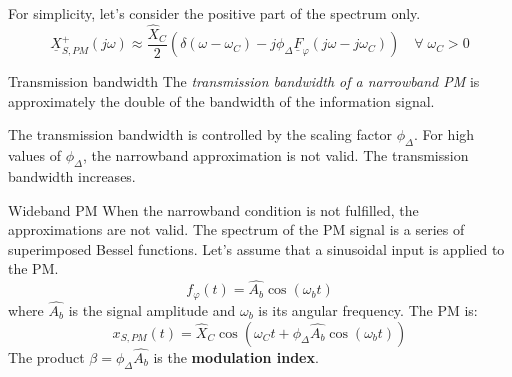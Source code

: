 \begin{refsection}
For simplicity, let's consider the positive part of the spectrum only.
\begin{equation}
	\underline{X}_{S,PM}^{+}\left(j\omega\right) \approx \frac{\hat{X}_C}{2} \left( \delta\left(\omega-\omega_C\right) - j \phi_{\Delta} \underline{F}_{\varphi}\left(j\omega-j\omega_C\right) \right) \quad \forall \; \omega_C > 0
\end{equation}

\begin{definition}{Transmission bandwidth}
	The  \emph{transmission bandwidth of a narrowband \ac{PM}} is approximately the double of the bandwidth of the information signal.
\end{definition}

%
%

The transmission bandwidth is controlled by the scaling factor $\phi_{\Delta}$. For high values of $\phi_{\Delta}$, the narrowband approximation is not valid. The transmission bandwidth increases.

\begin{excursus}{Wideband \ac{PM}}
	When the narrowband condition is not fulfilled, the approximations are not valid. The spectrum of the \ac{PM} signal is a series of superimposed Bessel functions. Let's assume that a sinusoidal input is applied to the \ac{PM}.
	\begin{equation}
		f_{\varphi}(t) = \hat{A_b} \cos\left(\omega_b t\right)
	\end{equation}
	where $\hat{A_b}$ is the signal amplitude and $\omega_b$ is its angular frequency. The \ac{PM} is:
	\begin{equation}
		x_{S,PM}(t) = \hat{X}_C \cos\left(\omega_C t + \phi_{\Delta} \hat{A_b} \cos\left(\omega_b t\right)\right)
	\end{equation}
	The product $\beta = \phi_{\Delta} \hat{A_b}$ is the  \textbf{modulation index}.
	

\end{excursus}
\end{refsection}
